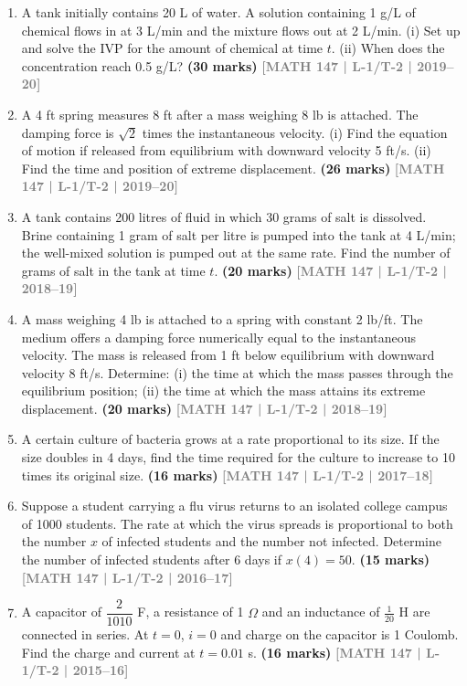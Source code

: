 \documentclass[12pt,a3paper]{article}
\newcommand{\yr}[1]{\hfill\textcolor{gray}{\small\textbf{[#1]}}}
\newcommand{\mk}[1]{\textcolor{orange!70!black}{\small\textbf{(#1 marks)}}}
\begin{document}
\begin{enumerate}
\item A tank initially contains 20 L of water. A solution containing 1 g/L of chemical flows in at 3 L/min and the mixture flows out at 2 L/min. (i) Set up and solve the IVP for the amount of chemical at time $t$. (ii) When does the concentration reach 0.5 g/L?
\mk{30} \yr{MATH 147 | L-1/T-2 | 2019--20}

\item A 4 ft spring measures 8 ft after a mass weighing 8 lb is attached. The damping force is $\sqrt{2}$ times the instantaneous velocity. (i) Find the equation of motion if released from equilibrium with downward velocity 5 ft/s. (ii) Find the time and position of extreme displacement.
\mk{26} \yr{MATH 147 | L-1/T-2 | 2019--20}

\item A tank contains 200 litres of fluid in which 30 grams of salt is dissolved. Brine containing 1 gram of salt per litre is pumped into the tank at 4 L/min; the well-mixed solution is pumped out at the same rate. Find the number of grams of salt in the tank at time $t$.
\mk{20} \yr{MATH 147 | L-1/T-2 | 2018--19}

\item A mass weighing 4 lb is attached to a spring with constant 2 lb/ft. The medium offers a damping force numerically equal to the instantaneous velocity. The mass is released from 1 ft below equilibrium with downward velocity 8 ft/s. Determine: (i) the time at which the mass passes through the equilibrium position; (ii) the time at which the mass attains its extreme displacement.
\mk{20} \yr{MATH 147 | L-1/T-2 | 2018--19}

\item A certain culture of bacteria grows at a rate proportional to its size. If the size doubles in 4 days, find the time required for the culture to increase to 10 times its original size.
\mk{16} \yr{MATH 147 | L-1/T-2 | 2017--18}

\item Suppose a student carrying a flu virus returns to an isolated college campus of 1000 students. The rate at which the virus spreads is proportional to both the number $x$ of infected students and the number not infected. Determine the number of infected students after 6 days if $x(4)=50$.
\mk{15} \yr{MATH 147 | L-1/T-2 | 2016--17}

\item A capacitor of $\dfrac{2}{1010}$ F, a resistance of 1 $\Omega$ and an inductance of $\tfrac{1}{20}$ H are connected in series. At $t=0$, $i=0$ and charge on the capacitor is 1 Coulomb. Find the charge and current at $t=0.01$ s.
\mk{16} \yr{MATH 147 | L-1/T-2 | 2015--16}

\end{enumerate}
\end{document}
